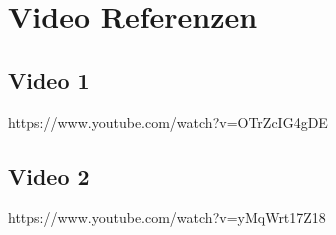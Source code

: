 \documentclass[11pt,a4paper]{article}
\begin{document}
\section{Video Referenzen}
\subsection{Video 1}
https://www.youtube.com/watch?v=OTrZcIG4gDE
\subsection{Video 2}
https://www.youtube.com/watch?v=yMqWrt17Z18
\end{document}
